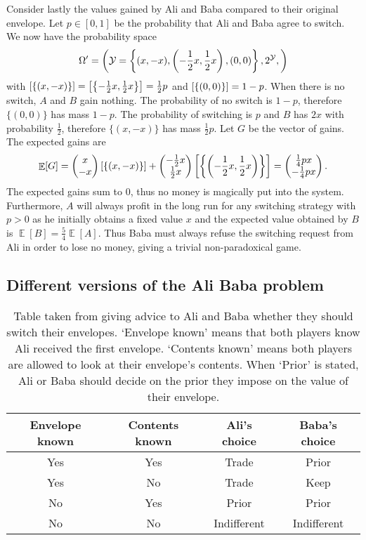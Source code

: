 \documentclass[a4paper]{report}
\theoremstyle{plain}
\theoremstyle{definition}
\theoremstyle{remark}
\numberwithin{equation}{chapter}
\let\P\relax
\DeclareMathOperator{\P}{\mathbb{P}}
\DeclareMathOperator{\E}{\mathbb{E}}
\DeclareMathOperator{\1}{\mathbbm{1}}
\newcommand{\Y}{\mathcal{Y}}
\begin{document}
Consider lastly the values gained by Ali and Baba compared to their original envelope. Let $p\in[0,1]$ be the probability that Ali and Baba agree to switch. We now have the probability space
\begin{equation}
\Omega'=\left(\Y=\left\{(x,-x),\left(-\frac{1}{2}x,\frac{1}{2}x\right),(0,0)\right\},2^\Y,\P\right)
\end{equation}
with $\P[\{(x,-x)\}]=\P\left[\left\{-\frac{1}{2}x,\frac{1}{2}x\right\}\right]=\frac{1}{2}p$ and $\P[\{(0,0)\}]=1-p$. When there is no switch, $A$ and $B$ gain nothing. The probability of no switch is $1-p$, therefore $\{(0,0)\}$ has mass $1-p$. The probability of switching is $p$ and $B$ has $2x$ with probability $\frac{1}{2}$, therefore $\{(x,-x)\}$ has mass $\frac{1}{2}p$. Let $G$ be the vector of gains. The expected gains are
\begin{align}
\E[G]=\begin{pmatrix}x\\-x\end{pmatrix}\P[\{(x,-x)\}]+\begin{pmatrix}-\frac{1}{2}x\\\frac{1}{2}x\end{pmatrix}\P\left[\left\{\left(-\frac{1}{2}x,\frac{1}{2}x\right)\right\}\right]=\begin{pmatrix}\frac{1}{4}px\\-\frac{1}{4}px\end{pmatrix}.
\end{align}
The expected gains sum to $0$, thus no money is magically put into the system. Furthermore, $A$ will always profit in the long run for any switching strategy with $p>0$ as he initially obtains a fixed value $x$ and the expected value obtained by $B$ is $\E[B]=\frac{5}{4}\E[A]$. Thus Baba must always refuse the switching request from Ali in order to lose no money, giving a trivial non-paradoxical game.

\subsection{Different versions of the Ali Baba problem}
\begin{table}
\centering
\begin{tabular}{cc|cc}
Envelope known&Contents known&Ali's choice&Baba's choice\\\hline
Yes&Yes&Trade&Prior\\
Yes&No&Trade&Keep\\
No&Yes&Prior&Prior\\
No&No&Indifferent&Indifferent
\end{tabular}

\caption{Table taken from \cite{Nickerson06} giving advice to Ali and Baba whether they should switch their envelopes. `Envelope known' means that both players know Ali received the first envelope. `Contents known' means both players are allowed to look at their envelope's contents. When `Prior' is stated, Ali or Baba should decide on the prior they impose on the value of their envelope.}
\label{tbl:alibaba}
\end{table}
\end{document}

